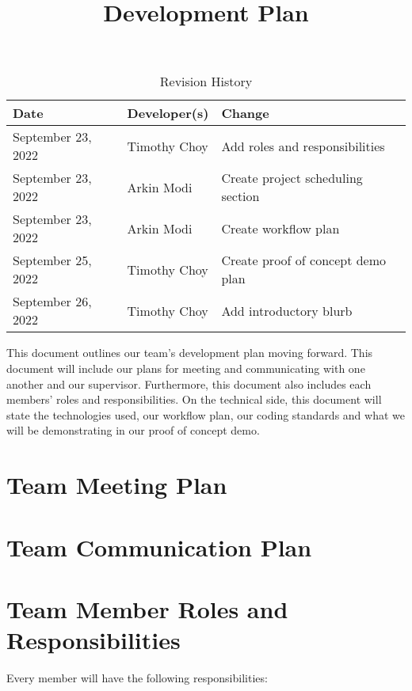 \documentclass{article}
\title{Development Plan\\\progname}
\author{\authname}
\date{}
\begin{document}
\begin{table}[hp]
\caption{Revision History} \label{TblRevisionHistory}
\begin{tabularx}{\textwidth}{llX}
\toprule
\textbf{Date} & \textbf{Developer(s)} & \textbf{Change}\\
\midrule
September 23, 2022 & Timothy Choy & Add roles and responsibilities\\
September 23, 2022 & Arkin Modi & Create project scheduling section\\
September 23, 2022 & Arkin Modi & Create workflow plan\\
September 25, 2022 & Timothy Choy & Create proof of concept demo plan\\
September 26, 2022 & Timothy Choy & Add introductory blurb\\
\bottomrule
\end{tabularx}
\end{table}

\newpage

\maketitle

This document outlines our team's development plan moving forward. This document will 
include our plans for meeting and communicating with one another and our supervisor. 
Furthermore, this document also includes each members' roles and responsibilities. On 
the technical side, this document will state the technologies used, our workflow plan, 
our coding standards and what we will be demonstrating in our proof of concept demo.

\section{Team Meeting Plan}

\section{Team Communication Plan}

\section{Team Member Roles and Responsibilities}

Every member will have the following responsibilities:
\end{document}
